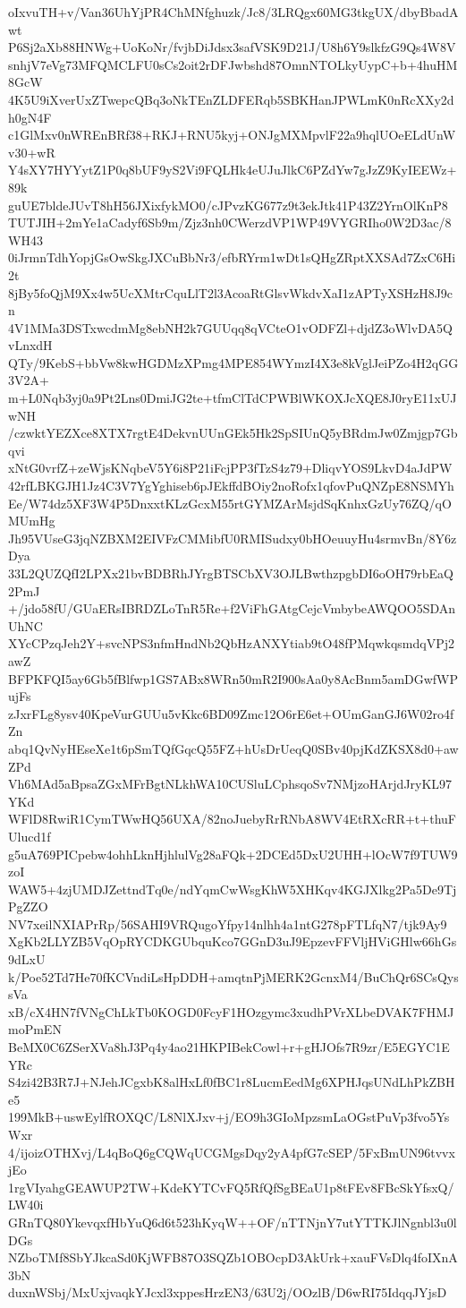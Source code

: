 oIxvuTH+v/Van36UhYjPR4ChMNfghuzk/Jc8/3LRQgx60MG3tkgUX/dbyBbadAwt
P6Sj2aXb88HNWg+UoKoNr/fvjbDiJdsx3safVSK9D21J/U8h6Y9slkfzG9Qs4W8V
snhjV7eVg73MFQMCLFU0sCs2oit2rDFJwbshd87OmnNTOLkyUypC+b+4huHM8GcW
4K5U9iXverUxZTwepcQBq3oNkTEnZLDFERqb5SBKHanJPWLmK0nRcXXy2dh0gN4F
c1GlMxv0nWREnBRf38+RKJ+RNU5kyj+ONJgMXMpvlF22a9hqlUOeELdUnWv30+wR
Y4sXY7HYYytZ1P0q8bUF9yS2Vi9FQLHk4eUJuJlkC6PZdYw7gJzZ9KyIEEWz+89k
guUE7bldeJUvT8hH56JXixfykMO0/cJPvzKG677z9t3ekJtk41P43Z2YrnOlKnP8
TUTJIH+2mYe1aCadyf6Sb9m/Zjz3nh0CWerzdVP1WP49VYGRIho0W2D3ac/8WH43
0iJrmnTdhYopjGsOwSkgJXCuBbNr3/efbRYrm1wDt1sQHgZRptXXSAd7ZxC6Hi2t
8jBy5foQjM9Xx4w5UcXMtrCquLlT2l3AcoaRtGlsvWkdvXaI1zAPTyXSHzH8J9cn
4V1MMa3DSTxwcdmMg8ebNH2k7GUUqq8qVCteO1vODFZl+djdZ3oWlvDA5QvLnxdH
QTy/9KebS+bbVw8kwHGDMzXPmg4MPE854WYmzI4X3e8kVglJeiPZo4H2qGG3V2A+
m+L0Nqb3yj0a9Pt2Lns0DmiJG2te+tfmClTdCPWBlWKOXJcXQE8J0ryE11xUJwNH
/czwktYEZXce8XTX7rgtE4DekvnUUnGEk5Hk2SpSIUnQ5yBRdmJw0Zmjgp7Gbqvi
xNtG0vrfZ+zeWjsKNqbeV5Y6i8P21iFcjPP3fTzS4z79+DliqvYOS9LkvD4aJdPW
42rfLBKGJH1Jz4C3V7YgYghiseb6pJEkffdBOiy2noRofx1qfovPuQNZpE8NSMYh
Ee/W74dz5XF3W4P5DnxxtKLzGcxM55rtGYMZArMsjdSqKnhxGzUy76ZQ/qOMUmHg
Jh95VUseG3jqNZBXM2EIVFzCMMibfU0RMISudxy0bHOeuuyHu4srmvBn/8Y6zDya
33L2QUZQfI2LPXx21bvBDBRhJYrgBTSCbXV3OJLBwthzpgbDI6oOH79rbEaQ2PmJ
+/jdo58fU/GUaERsIBRDZLoTnR5Re+f2ViFhGAtgCejcVmbybeAWQOO5SDAnUhNC
XYcCPzqJeh2Y+svcNPS3nfmHndNb2QbHzANXYtiab9tO48fPMqwkqsmdqVPj2awZ
BFPKFQI5ay6Gb5fBlfwp1GS7ABx8WRn50mR2I900sAa0y8AcBnm5amDGwfWPujFs
zJxrFLg8ysv40KpeVurGUUu5vKkc6BD09Zmc12O6rE6et+OUmGanGJ6W02ro4fZn
abq1QvNyHEseXe1t6pSmTQfGqcQ55FZ+hUsDrUeqQ0SBv40pjKdZKSX8d0+awZPd
Vh6MAd5aBpsaZGxMFrBgtNLkhWA10CUSluLCphsqoSv7NMjzoHArjdJryKL97YKd
WFlD8RwiR1CymTWwHQ56UXA/82noJuebyRrRNbA8WV4EtRXcRR+t+thuFUlucd1f
g5uA769PICpebw4ohhLknHjhlulVg28aFQk+2DCEd5DxU2UHH+lOcW7f9TUW9zoI
WAW5+4zjUMDJZettndTq0e/ndYqmCwWsgKhW5XHKqv4KGJXlkg2Pa5De9TjPgZZO
NV7xeilNXIAPrRp/56SAHI9VRQugoYfpy14nlhh4a1ntG278pFTLfqN7/tjk9Ay9
XgKb2LLYZB5VqOpRYCDKGUbquKco7GGnD3uJ9EpzevFFVljHViGHlw66hGs9dLxU
k/Poe52Td7He70fKCVndiLsHpDDH+amqtnPjMERK2GcnxM4/BuChQr6SCsQyssVa
xB/cX4HN7fVNgChLkTb0KOGD0FcyF1HOzgymc3xudhPVrXLbeDVAK7FHMJmoPmEN
BeMX0C6ZSerXVa8hJ3Pq4y4ao21HKPIBekCowl+r+gHJOfs7R9zr/E5EGYC1EYRc
S4zi42B3R7J+NJehJCgxbK8alHxLf0fBC1r8LucmEedMg6XPHJqsUNdLhPkZBHe5
199MkB+uswEylfROXQC/L8NlXJxv+j/EO9h3GIoMpzsmLaOGstPuVp3fvo5YsWxr
4/ijoizOTHXvj/L4qBoQ6gCQWqUCGMgsDqy2yA4pfG7cSEP/5FxBmUN96tvvxjEo
1rgVIyahgGEAWUP2TW+KdeKYTCvFQ5RfQfSgBEaU1p8tFEv8FBcSkYfsxQ/LW40i
GRnTQ80YkevqxfHbYuQ6d6t523hKyqW++OF/nTTNjnY7utYTTKJlNgnbl3u0lDGs
NZboTMf8SbYJkcaSd0KjWFB87O3SQZb1OBOcpD3AkUrk+xauFVsDlq4foIXnA3bN
duxnWSbj/MxUxjvaqkYJcxl3xppesHrzEN3/63U2j/OOzlB/D6wRI75IdqqJYjsD
